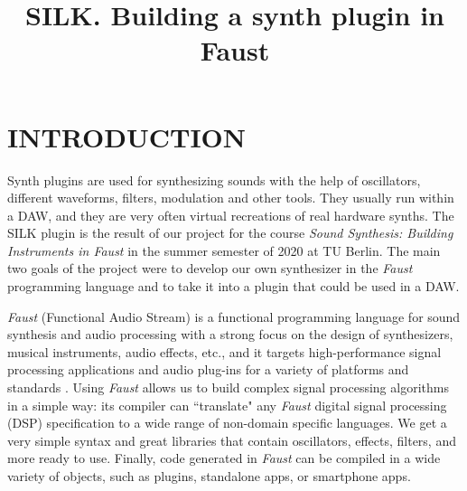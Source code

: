 \documentclass{aes2e}
\begin{document}


\title{SILK. Building a synth plugin in Faust }




\maketitle

\section{INTRODUCTION}




    

Synth plugins are used for synthesizing sounds with the help of oscillators, different waveforms, filters, modulation and other tools. They usually run within a DAW, and they are very often virtual recreations of real hardware synths. The SILK plugin is the result of our project for the course \textit{Sound Synthesis: Building Instruments in \textit{Faust}} in the summer semester of 2020 at TU Berlin. The main two goals of the project were to develop our own synthesizer in the \textit{Faust} programming language and to take it into a plugin that could be used in a DAW.

\textit{Faust} (Functional Audio Stream) is a functional programming language for sound synthesis and audio processing with a strong focus on the design of synthesizers, musical instruments, audio effects, etc., and it targets high-performance signal processing applications and audio plug-ins for a variety of platforms and standards \cite{FAUST}. Using \textit{Faust} allows us to build complex signal processing algorithms in a simple way: its compiler can ``translate" any \textit{Faust} digital signal processing (DSP) specification to a wide range of non-domain specific languages. We get a very simple syntax and great libraries that contain oscillators, effects, filters, and more ready to use. Finally, code generated in \textit{Faust} can be compiled in a wide variety of objects, such as plugins, standalone apps, or smartphone apps.
\end{document}
